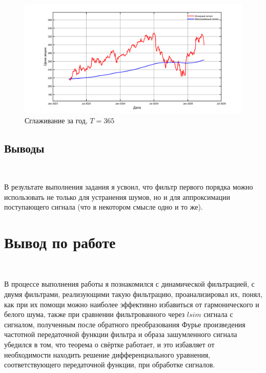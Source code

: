 \documentclass[a4paper]{article}
\begin{document}
\begin{figure}[H]
    \centering
    \includegraphics[width=\linewidth]{ex2/365.png}
    \caption{Сглаживание за год, $T = 365$}
\end{figure}

\subsection{Выводы}\

В результате выполнения задания я усвоил, что фильтр первого порядка можно использовать не только для устранения шумов, но и для аппроксимации поступающего сигнала (что в некотором смысле одно и то же).

\section{Вывод по работе}\

В процессе выполнения работы я познакомился с динамической фильтрацией, с двумя фильтрами, реализующими такую фильтрацию, проанализировал их, понял, как при их помощи можно наиболее эффективно избавиться от гармонического и белого шума, также при сравнении фильтрованного через $lsim$ сигнала с сигналом, полученным после обратного преобразования Фурье произведения частотной передаточной функции фильтра и образа зашумленного сигнала убедился в том, что теорема о свёртке работает, и это избавляет от необходимости находить решение дифференциального уравнения, соответствующего передаточной функции, при обработке сигналов.
\end{document}
